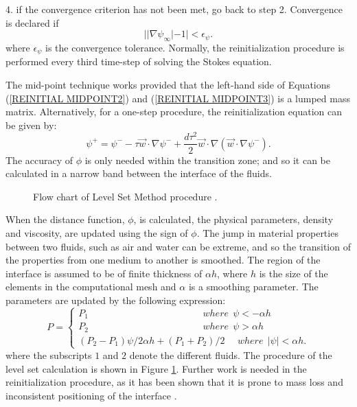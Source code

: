 4. if the convergence criterion has not been met, go back to step 2. Convergence is declared if
%
\begin{equation}
||\nabla \psi _{\infty}| - 1| < \epsilon _{\psi}.
\label{REINITIAL CONVERGE}
\end{equation}
%
where $\epsilon _{\psi}$ is the convergence tolerance. Normally, the reinitialization procedure is performed every third time-step of solving the Stokes equation.

The mid-point technique works provided that the left-hand side of Equations (\ref{REINITIAL MIDPOINT2}) and (\ref{REINITIAL MIDPOINT3}) is a lumped mass matrix. Alternatively, for a one-step procedure, the reinitialization equation can be given by:
%
\begin{equation}
\psi^{+} = \psi^{-} - \tau \vec{w} \cdot \nabla \psi^{-} + \frac{d \tau^{2}}{2} \vec{w} \cdot \nabla(\vec{w} \cdot \nabla \psi^{-}).
\label{REINITIAL ONESTEP}
\end{equation}
%
The accuracy of $\phi$ is only needed within the transition zone; and so it can be calculated in a narrow band between the interface of the fluids. 
%
\begin{figure}
\center
{}
\caption{Flow chart of Level Set Method procedure \cite{LIN2005}.}
\label{LEVELSET FLOWCHART}
\end{figure}
%
When the distance function, $\phi$, is calculated, the physical parameters, density and viscosity, are updated using the sign of $\phi$. The jump in material properties between two fluids, such as air and water can be extreme, and so the transition of the properties from one medium to another is smoothed. The region of the interface is assumed to be of finite thickness of $\alpha h$, where $h$ is the size of the elements in the computational mesh and $\alpha$ is a smoothing parameter. The parameters are updated by the following expression:
%
\begin{equation}
P = 
\left \{ \begin{array}{l}
P_{1} \hspace{5cm}  where \ \ \psi < - \alpha h \\
P_{2} \hspace{5cm}  where \ \ \psi > \alpha h \\
(P_{2} - P_{1}) \psi/2\alpha h + (P_{1} + P_{2})/2 \ \ \ \ \ \ where \ \ |\psi| < \alpha h.
\end{array}
\right.
\label{UPDATE PARAMETERS}
\end{equation} 
%
where the subscripts $1$ and $2$ denote the different fluids. The procedure of the level set calculation is shown in Figure \ref{LEVELSET FLOWCHART}.
Further work is needed in the reinitialization procedure, as it has been shown that it is prone to mass loss and inconsistent positioning of the interface \cite{SUCKALE2008}.


